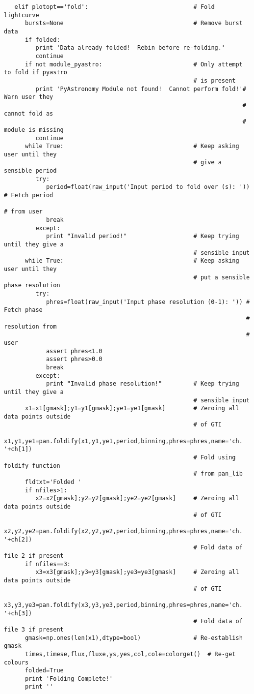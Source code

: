 \begin{verbatim}
   elif plotopt=='fold':                              # Fold lightcurve
      bursts=None                                     # Remove burst data
      if folded:
         print 'Data already folded!  Rebin before re-folding.'
         continue
      if not module_pyastro:                          # Only attempt to fold if pyastro
                                                      # is present
         print 'PyAstronomy Module not found!  Cannot perform fold!'# Warn user they
                                                                    # cannot fold as
                                                                    # module is missing
         continue
      while True:                                     # Keep asking user until they
                                                      # give a sensible period
         try:
            period=float(raw_input('Input period to fold over (s): '))   # Fetch period
                                                                         # from user
            break
         except:
            print "Invalid period!"                   # Keep trying until they give a
                                                      # sensible input
      while True:                                     # Keep asking user until they
                                                      # put a sensible phase resolution
         try:
            phres=float(raw_input('Input phase resolution (0-1): ')) # Fetch phase
                                                                     # resolution from
                                                                     # user
            assert phres<1.0
            assert phres>0.0
            break
         except:
            print "Invalid phase resolution!"         # Keep trying until they give a
                                                      # sensible input
      x1=x1[gmask];y1=y1[gmask];ye1=ye1[gmask]        # Zeroing all data points outside
                                                      # of GTI
      x1,y1,ye1=pan.foldify(x1,y1,ye1,period,binning,phres=phres,name='ch. '+ch[1])
                                                      # Fold using foldify function
                                                      # from pan_lib
      fldtxt='Folded '
      if nfiles>1:
         x2=x2[gmask];y2=y2[gmask];ye2=ye2[gmask]     # Zeroing all data points outside
                                                      # of GTI
         x2,y2,ye2=pan.foldify(x2,y2,ye2,period,binning,phres=phres,name='ch. '+ch[2])
                                                      # Fold data of file 2 if present
      if nfiles==3:
         x3=x3[gmask];y3=y3[gmask];ye3=ye3[gmask]     # Zeroing all data points outside
                                                      # of GTI
         x3,y3,ye3=pan.foldify(x3,y3,ye3,period,binning,phres=phres,name='ch. '+ch[3])
                                                      # Fold data of file 3 if present
      gmask=np.ones(len(x1),dtype=bool)               # Re-establish gmask
      times,timese,flux,fluxe,ys,yes,col,cole=colorget()  # Re-get colours
      folded=True
      print 'Folding Complete!'
      print ''


\end{verbatim}
